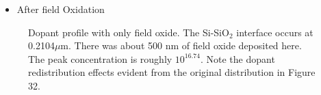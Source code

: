 \documentclass{article}
\begin{document}
\begin{description}[style = nextline]
\begin{itemize} 
\item After field Oxidation 
\end{itemize}
\begin{figure}[H]
\centering
{}
\caption{Dopant profile with only field oxide. The Si-Si$\text{O}_2$ interface occurs at 0.2104$\mu$m. There was about 500 nm of field oxide deposited here. The peak concentration is roughly ${10}^{16.74}$. Note the dopant redistribution effects evident from the original distribution in Figure 32.}
\label{fig:doping1}
\end{figure}


\end{description}
\end{document}

